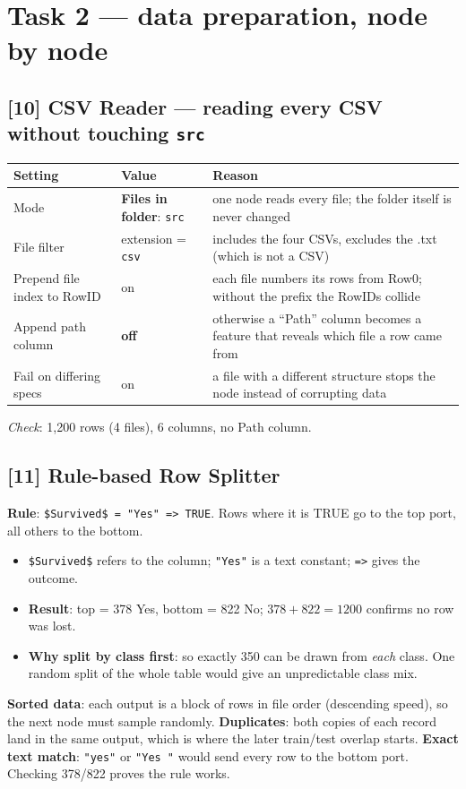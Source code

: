 \documentclass[11pt,a4paper]{article}
\newcommand{\cd}[1]{\texttt{#1}}                     %
\begin{document}
\section{Task 2 --- data preparation, node by node}

\subsection*{[10] CSV Reader --- reading every CSV without touching \cd{src}}
\begin{tabularx}{\linewidth}{@{}p{3.4cm}p{3.4cm}L@{}}
\toprule Setting & Value & Reason \\ \midrule
Mode & \textbf{Files in folder}: \cd{src} & one node reads every file; the folder itself is never changed \\
File filter & extension = \cd{csv} & includes the four CSVs, excludes the .txt (which is not a CSV) \\
Prepend file index to RowID & on & each file numbers its rows from Row0; without the prefix the RowIDs collide \\
Append path column & \textbf{off} & otherwise a ``Path'' column becomes a feature that reveals which file a row came from \\
Fail on differing specs & on & a file with a different structure stops the node instead of corrupting data \\ \bottomrule
\end{tabularx}
\textit{Check}: 1,200 rows (4 files), 6 columns, no Path column.

\subsection*{[11] Rule-based Row Splitter}
\textbf{Rule}: \cd{\$Survived\$ = "Yes" => TRUE}. Rows where it is TRUE go to the top port, all others to the bottom.
\begin{itemize}
  \item \cd{\$Survived\$} refers to the column; \cd{"Yes"} is a text constant; \cd{=>} gives the outcome.
  \item \textbf{Result}: top = 378 Yes, bottom = 822 No; $378 + 822 = 1200$ confirms no row was lost.
  \item \textbf{Why split by class first}: so exactly 350 can be drawn from \emph{each} class. One random split of the
        whole table would give an unpredictable class mix.
\end{itemize}
\begin{issue}
\textbf{Sorted data}: each output is a block of rows in file order (descending speed), so the next node must sample
randomly.
\textbf{Duplicates}: both copies of each record land in the same output, which is where the later train/test
overlap starts.
\textbf{Exact text match}: \cd{"yes"} or \cd{"Yes "} would send every row to the bottom port. Checking 378/822 proves the
rule works.
\end{issue}
\end{document}
